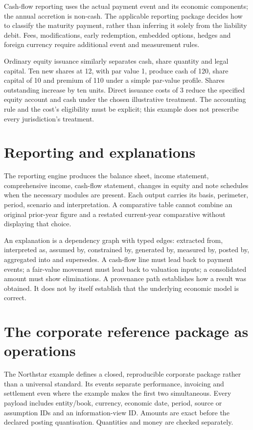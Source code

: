 Cash-flow reporting uses the actual payment event and its economic components;
the annual accretion is non-cash. The applicable reporting package decides how
to classify the maturity payment, rather than inferring it solely from the
liability debit. Fees, modifications, early redemption, embedded options,
hedges and foreign currency require additional event and measurement rules.

Ordinary equity issuance similarly separates cash, share quantity and legal
capital. Ten new shares at 12, with par value 1, produce cash of 120, share
capital of 10 and premium of 110 under a simple par-value profile. Shares
outstanding increase by ten units. Direct issuance costs of 3 reduce the
specified equity account and cash under the chosen illustrative treatment.
The accounting rule and the cost's eligibility must be explicit; this example
does not prescribe every jurisdiction's treatment.

\section{Reporting and explanations}

The reporting engine produces the balance sheet, income statement, comprehensive
income, cash-flow statement, changes in equity and note schedules when the
necessary modules are present. Each output carries its basis, perimeter,
period, scenario and interpretation. A comparative table cannot combine an
original prior-year figure and a restated current-year comparative without
displaying that choice.

An explanation is a dependency graph with typed edges: extracted from,
interpreted as, assumed by, constrained by, generated by, measured by,
posted by, aggregated into and supersedes. A cash-flow line must lead back
to payment events; a fair-value movement must lead back to valuation inputs;
a consolidated amount must show eliminations. A provenance path establishes
how a result was obtained. It does not by itself establish that the underlying
economic model is correct.

\section{The corporate reference package as operations}

The Northstar example defines a closed, reproducible corporate package rather
than a universal standard. Its events separate performance, invoicing and
settlement even where the example makes the first two simultaneous. Every
payload includes entity/book, currency, economic date, period, source or
assumption IDs and an information-view ID. Amounts are exact before the
declared posting quantisation. Quantities and money are checked separately.

